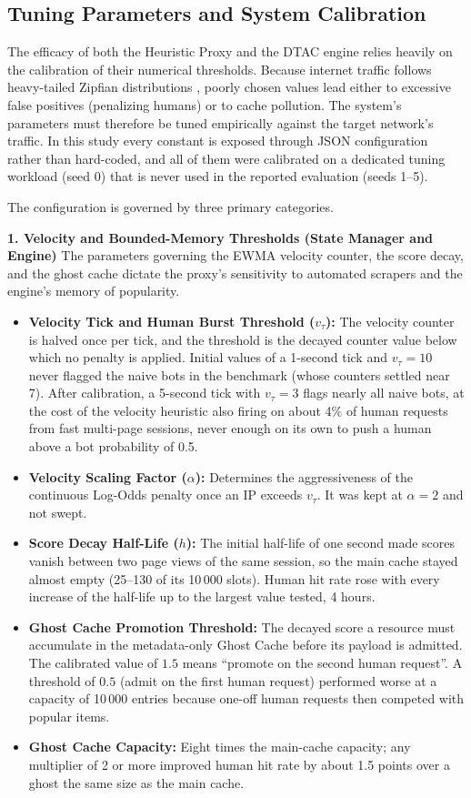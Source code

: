 \subsection{Tuning Parameters and System Calibration}
The efficacy of both the Heuristic Proxy and the DTAC engine relies heavily on the calibration of their numerical thresholds. Because internet traffic follows heavy-tailed Zipfian distributions \cite{breslau_web_1999}, poorly chosen values lead either to excessive false positives (penalizing humans) or to cache pollution. The system's parameters must therefore be tuned empirically against the target network's traffic. In this study every constant is exposed through JSON configuration rather than hard-coded, and all of them were calibrated on a dedicated tuning workload (seed 0) that is never used in the reported evaluation (seeds 1--5).

The configuration is governed by three primary categories.

\textbf{1. Velocity and Bounded-Memory Thresholds (State Manager and Engine)}
The parameters governing the EWMA velocity counter, the score decay, and the ghost cache dictate the proxy's sensitivity to automated scrapers and the engine's memory of popularity.
\begin{itemize}
    \item \textbf{Velocity Tick and Human Burst Threshold ($v_{\tau}$):} The velocity counter is halved once per tick, and the threshold is the decayed counter value below which no penalty is applied. Initial values of a 1-second tick and $v_{\tau} = 10$ never flagged the naive bots in the benchmark (whose counters settled near 7). After calibration, a 5-second tick with $v_{\tau} = 3$ flags nearly all naive bots, at the cost of the velocity heuristic also firing on about 4\% of human requests from fast multi-page sessions, never enough on its own to push a human above a bot probability of 0.5.
    \item \textbf{Velocity Scaling Factor ($\alpha$):} Determines the aggressiveness of the continuous Log-Odds penalty once an IP exceeds $v_{\tau}$. It was kept at $\alpha = 2$ and not swept.
    \item \textbf{Score Decay Half-Life ($h$):} The initial half-life of one second made scores vanish between two page views of the same session, so the main cache stayed almost empty (25--130 of its 10\,000 slots). Human hit rate rose with every increase of the half-life up to the largest value tested, 4 hours.
    \item \textbf{Ghost Cache Promotion Threshold:} The decayed score a resource must accumulate in the metadata-only Ghost Cache before its payload is admitted. The calibrated value of $1.5$ means ``promote on the second human request''. A threshold of $0.5$ (admit on the first human request) performed worse at a capacity of 10\,000 entries because one-off human requests then competed with popular items.
    \item \textbf{Ghost Cache Capacity:} Eight times the main-cache capacity; any multiplier of 2 or more improved human hit rate by about 1.5 points over a ghost the same size as the main cache.
\end{itemize}

